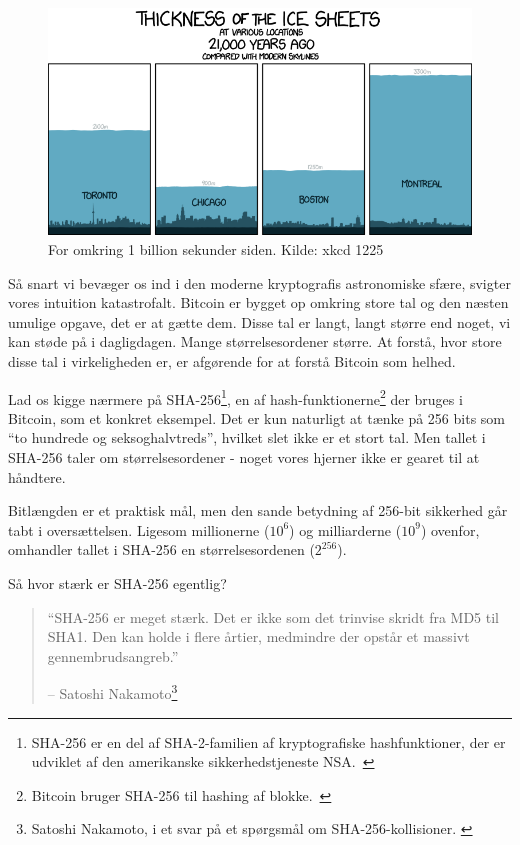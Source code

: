 \documentclass[paper=6in:9in,pagesize=pdftex,
               headinclude=on,footinclude=on,12pt]{scrbook}
\begin{document}
\begin{figure}
  \includegraphics{assets/images/xkcd-1225.png}
  \caption{For omkring 1 billion sekunder siden. Kilde: xkcd 1225}
  \label{fig:xkcd-1225}
\end{figure}

Så snart vi bevæger os ind i den moderne kryptografis astronomiske sfære, svigter vores intuition katastrofalt. Bitcoin er bygget op omkring store tal og den næsten umulige opgave, det er at gætte dem. Disse tal er langt, langt større end noget, vi kan støde på i dagligdagen. Mange størrelsesordener større. At forstå, hvor store disse tal i virkeligheden er, er afgørende for at forstå Bitcoin som helhed.

Lad os kigge nærmere på SHA-256\footnote{SHA-256 er en del af SHA-2-familien af kryptografiske hashfunktioner, der er udviklet af den amerikanske sikkerhedstjeneste NSA.~\cite{wiki:sha2}}, en af hash-funktionerne\footnote{Bitcoin bruger SHA-256 til hashing af blokke.~\cite{btcwiki:block-hashing}} der bruges i Bitcoin, som et konkret eksempel. Det er kun naturligt at tænke på 256 bits som \enquote{to hundrede og seksoghalvtreds}, hvilket slet ikke er et stort tal. Men tallet i SHA-256 taler om størrelsesordener - noget vores hjerner ikke er gearet til at håndtere.

Bitlængden er et praktisk mål, men den sande betydning af 256-bit sikkerhed går tabt i oversættelsen. Ligesom millionerne ($10^6$) og milliarderne ($10^9$) ovenfor, omhandler tallet i SHA-256 en størrelsesordenen ($2^{256}$).

Så hvor stærk er SHA-256 egentlig?\begin{quotation}\begin{samepage} \enquote{SHA-256 er meget stærk. Det er ikke som det trinvise skridt fra MD5 til SHA1. Den kan holde i flere årtier, medmindre der opstår et massivt gennembrudsangreb.} \begin{flushright} -- Satoshi Nakamoto\footnote{Satoshi Nakamoto, i et svar på et spørgsmål om SHA-256-kollisioner. \cite{satoshi-sha256}}
\end{flushright}\end{samepage}\end{quotation}
\end{document}

